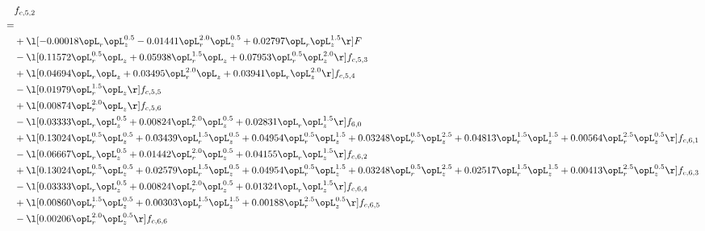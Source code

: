 \begin{alignat}{2} 
\label{eq:f_52_2} 
& f_{c,5,2} \nonumber \\ 
 = \\ 
& + \l[  -0.00018 \opL_r \opL_z^{0.5}   -0.01441 \opL_r^{2.0} \opL_z^{0.5} +  0.02797 \opL_r \opL_z^{1.5}  \r] F \nonumber \\ 
& - \l[  0.11572 \opL_r^{0.5} \opL_z +  0.05938 \opL_r^{1.5} \opL_z +  0.07953 \opL_r^{0.5} \opL_z^{2.0}  \r] f_{c,5,3} \nonumber \\ 
& + \l[  0.04694 \opL_r \opL_z +  0.03495 \opL_r^{2.0} \opL_z +  0.03941 \opL_r \opL_z^{2.0}  \r] f_{c,5,4} \nonumber \\ 
& - \l[  0.01979 \opL_r^{1.5} \opL_z  \r] f_{c,5,5} \nonumber \\ 
& + \l[  0.00874 \opL_r^{2.0} \opL_z  \r] f_{c,5,6} \nonumber \\ 
& - \l[  0.03333 \opL_r \opL_z^{0.5} +  0.00824 \opL_r^{2.0} \opL_z^{0.5} +  0.02831 \opL_r \opL_z^{1.5}  \r] f_{6,0} \nonumber \\ 
& + \l[  0.13024 \opL_r^{0.5} \opL_z^{0.5} +  0.03439 \opL_r^{1.5} \opL_z^{0.5} +  0.04954 \opL_r^{0.5} \opL_z^{1.5} +  0.03248 \opL_r^{0.5} \opL_z^{2.5} +  0.04813 \opL_r^{1.5} \opL_z^{1.5} +  0.00564 \opL_r^{2.5} \opL_z^{0.5}  \r] f_{c,6,1} \nonumber \\ 
& - \l[  0.06667 \opL_r \opL_z^{0.5} +  0.01442 \opL_r^{2.0} \opL_z^{0.5} +  0.04155 \opL_r \opL_z^{1.5}  \r] f_{c,6,2} \nonumber \\ 
& + \l[  0.13024 \opL_r^{0.5} \opL_z^{0.5} +  0.02579 \opL_r^{1.5} \opL_z^{0.5} +  0.04954 \opL_r^{0.5} \opL_z^{1.5} +  0.03248 \opL_r^{0.5} \opL_z^{2.5} +  0.02517 \opL_r^{1.5} \opL_z^{1.5} +  0.00413 \opL_r^{2.5} \opL_z^{0.5}  \r] f_{c,6,3} \nonumber \\ 
& - \l[  0.03333 \opL_r \opL_z^{0.5} +  0.00824 \opL_r^{2.0} \opL_z^{0.5} +  0.01324 \opL_r \opL_z^{1.5}  \r] f_{c,6,4} \nonumber \\ 
& + \l[  0.00860 \opL_r^{1.5} \opL_z^{0.5} +  0.00303 \opL_r^{1.5} \opL_z^{1.5} +  0.00188 \opL_r^{2.5} \opL_z^{0.5}  \r] f_{c,6,5} \nonumber \\ 
& - \l[  0.00206 \opL_r^{2.0} \opL_z^{0.5}  \r] f_{c,6,6} \nonumber \\ 
\end{alignat} 


